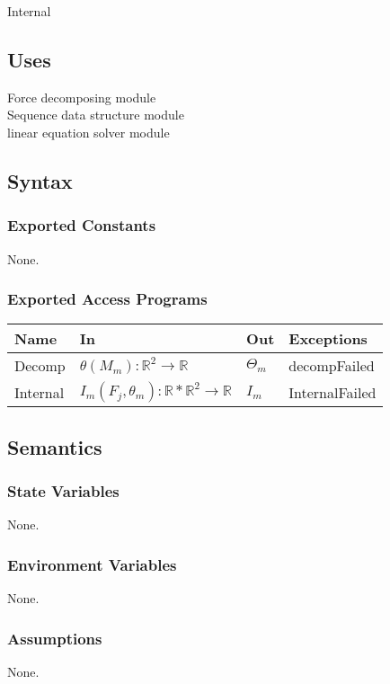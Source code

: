 \documentclass[12pt, titlepage]{article}
\begin{document}
Internal

\subsection{Uses}
Force decomposing module\\
Sequence data structure module\\
linear equation solver module\\



\subsection{Syntax}

\subsubsection{Exported Constants}
None.
\subsubsection{Exported Access Programs}
\begin{center}
\begin{tabular}{p{2cm} p{4cm} p{4cm} p{2cm}}
\hline
\textbf{Name} & \textbf{In} & \textbf{Out} & \textbf{Exceptions} \\
\hline
Decomp & $\theta(M_{m}):\mathbb{R}^{2} \rightarrow \mathbb{R}$  &$\Theta_m$ & decompFailed \\
Internal & $I_m(F_j,\theta_m):\mathbb{R}*\mathbb{R}^{2} \rightarrow \mathbb{R}$  &$I_m$ & InternalFailed \\
\hline
\end{tabular}
\end{center}
\subsection{Semantics}
\subsubsection{State Variables}
None.

\subsubsection{Environment Variables}
None.

\subsubsection{Assumptions}
None.
\end{document}
